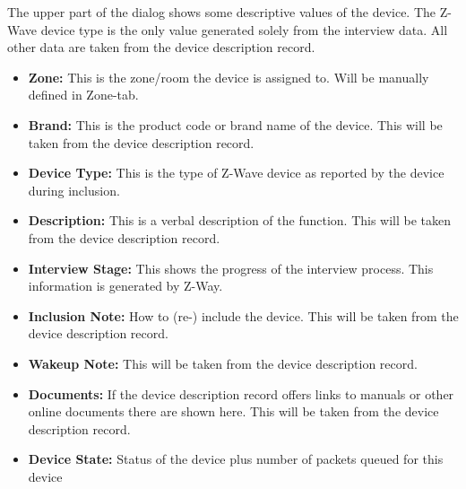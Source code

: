 The upper part of the dialog shows some descriptive values of the device.  The Z-Wave device type 
is the only value generated solely from the interview data. All other data are taken from the device 
description record.
\begin{itemize}
\item  {\bf Zone:} This is the zone/room the device is assigned to. Will be manually defined in Zone-tab.

\item  {\bf Brand:} This is the product code or brand name of the device. This will be taken from the device description record.

\item  {\bf Device Type:} This is the type of Z-Wave device as reported by the device during inclusion.

\item  {\bf Description:} This is a verbal description of the function. This will be taken from the device description record.

\item  {\bf Interview Stage:} This shows the progress of the interview process. This information is generated by Z-Way.

\item  {\bf Inclusion Note:} How to (re-) include the device. This will be taken from the device description record.

\item  {\bf Wakeup Note:} This will be taken from the device description record.

\item  {\bf Documents:} If the device description record offers links to manuals or other online documents there are 
shown here. This will be taken from the device description record.

\item  {\bf Device State:}  Status of the device plus number of packets queued for this device
\end{itemize}
 
